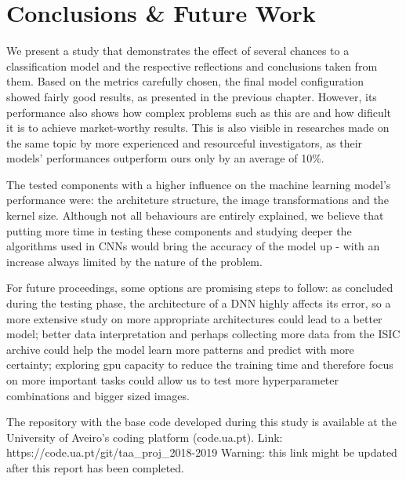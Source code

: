 \documentclass[10pt]{IEEEtran}
\begin{document}
\newpage{}
\section{\textbf{Conclusions \& Future Work}} %

We present a study that demonstrates the effect of several chances to a classification model and the respective reflections and conclusions taken from them.
Based on the metrics carefully chosen, the final model configuration showed fairly good results, as presented in the previous chapter. 
However, its performance also shows how complex problems such as this are and how dificult it is to achieve market-worthy results. 
This is also visible in researches made on the same topic by more experienced and resourceful investigators, as their models' performances outperform ours only by an average of 10\%.

The tested components with a higher influence on the machine learning model's performance were: the architeture structure, the image transformations and the kernel size.
Although not all behaviours are entirely explained, we believe that putting more time in testing these components and studying deeper the algorithms used in CNNs would bring the accuracy of the model up - with an increase always limited by the nature of the problem.

For future proceedings, some options are promising steps to follow: as concluded during the testing phase, the architecture of a DNN highly affects its error, so a more extensive study on more appropriate architectures could lead to a better model; better data interpretation and perhaps collecting more data from the ISIC archive could help the model learn more patterns and predict with more certainty; exploring gpu capacity to reduce the training time and therefore focus on more important tasks could allow us to test more hyperparameter combinations and bigger sized images.

The repository with the base code developed during this study is available at the University of Aveiro's coding platform (code.ua.pt). 
Link: https://code.ua.pt/git/taa\_proj\_2018-2019
Warning: this link might be updated after this report has been completed.
\end{document}
